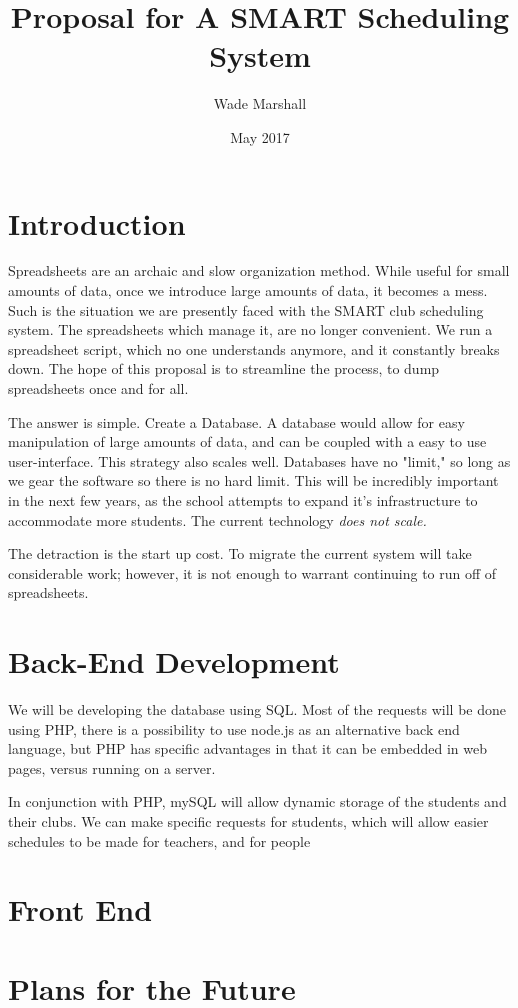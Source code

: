\documentclass{article}
\title{Proposal for A SMART Scheduling System}
\author{Wade Marshall }
\date{May 2017}
\begin{document}
\maketitle

\section{Introduction}
Spreadsheets are an archaic and slow organization method. While useful for small amounts of data, once we introduce large amounts of data, it
becomes a mess. Such is the situation we are presently faced with the SMART club scheduling system. The spreadsheets which manage it, are no
longer convenient. We run a spreadsheet script, which no one understands anymore, and it constantly breaks down. The hope of this proposal is to 
streamline the process, to dump spreadsheets once and for all. 

The answer is simple. Create a Database. A database would allow for easy manipulation of large amounts of data, and can be coupled with a easy
to use user-interface. This strategy also scales well. Databases have no "limit," so long as we gear the software so there is no hard limit. This 
will be incredibly important in the next few years, as the school attempts to expand it's infrastructure to accommodate more students. The 
current technology \emph{does not scale.}

The detraction is the start up cost. To migrate the current system will take considerable work; however, it is not enough to warrant continuing
to run off of spreadsheets. 

\section{Back-End Development}
We will be developing the database using SQL. Most of the requests will be done using PHP, there is a possibility to use node.js as an alternative back end language, but PHP has specific advantages in that it can be embedded in web pages, versus running on a server. 

In conjunction with PHP, mySQL will allow dynamic storage of the students and their clubs. We can make specific requests for students, which will
allow easier schedules to be made for teachers, and for people 
\section{Front End}

\section{Plans for the Future}
\end{document}
